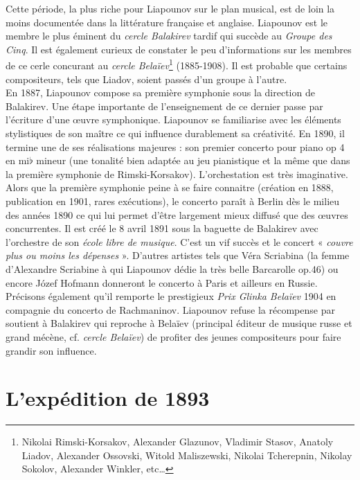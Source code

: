 Cette période, la plus riche pour Liapounov sur le plan musical, est de loin la moins documentée dans la littérature française et anglaise. Liapounov est le membre le plus éminent du \emph{cercle Balakirev} tardif qui succède au \emph{Groupe des Cinq}. Il est également curieux de constater le peu d'informations sur les membres de ce cerle concurant au \emph{cercle Belaïev}\footnote{Nikolai Rimski-Korsakov, Alexander Glazunov, Vladimir Stasov, Anatoly Liadov, Alexander Ossovski, Witold Maliszewski, Nikolai Tcherepnin, Nikolay Sokolov, Alexander Winkler, etc\dots} (1885-1908). Il est probable que certains compositeurs, tels que Liadov, soient passés d'un groupe à l'autre.\\

En 1887, Liapounov compose sa première symphonie sous la direction de Balakirev. Une étape importante de l'enseignement de ce dernier passe par l'écriture d'une œuvre symphonique. Liapounov se familiarise avec les éléments stylistiques de son maître ce qui influence durablement sa créativité. En 1890, il termine une de ses réalisations majeures : son premier concerto pour piano op 4 en mi$\flat$ mineur (une tonalité bien adaptée au jeu pianistique et la même que dans la première symphonie de Rimski-Korsakov). L'orchestation est très imaginative. Alors que la première symphonie peine à se faire connaitre (création en 1888, publication en 1901, rares exécutions), le concerto paraît à Berlin dès le milieu des années 1890 ce qui lui permet d'être largement mieux diffusé que des œuvres concurrentes. Il est créé le 8 avril 1891 sous la baguette de Balakirev avec l'orchestre de son \emph{école libre de musique}. C'est un vif succès et le concert « \emph{couvre plus ou moins les dépenses} ». D'autres artistes tels que Véra Scriabina (la femme d'Alexandre Scriabine à qui Liapounov dédie la très belle Barcarolle op.46) ou encore Józef Hofmann donneront le concerto à Paris et ailleurs en Russie. Précisons également qu'il remporte le prestigieux \emph{Prix Glinka Belaïev} 1904 en compagnie du concerto  de Rachmaninov. Liapounov refuse la récompense par soutient à Balakirev qui reproche à Belaïev (principal éditeur de musique russe et grand mécène, cf. \emph{cercle Belaïev}) de profiter des jeunes compositeurs pour faire grandir son influence.

\section{L'expédition de 1893}

